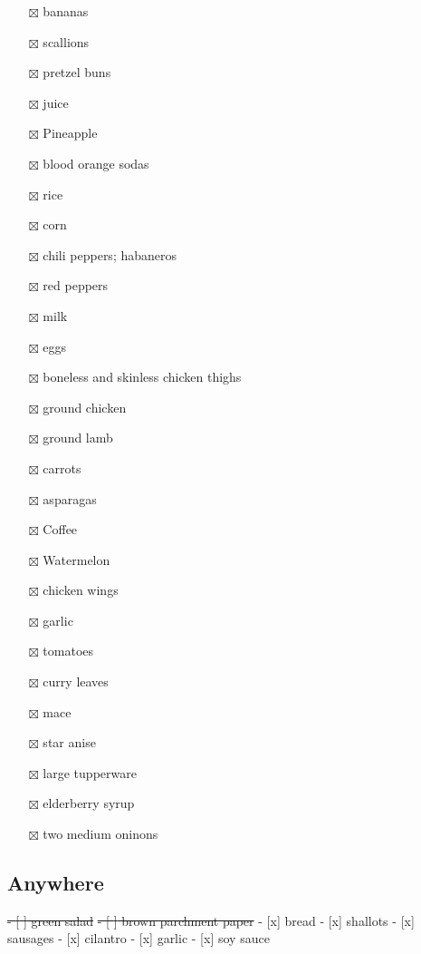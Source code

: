\documentclass[
]{article}
\providecommand{\tightlist}{%
  \setlength{\itemsep}{0pt}\setlength{\parskip}{0pt}}
\begin{document}
\begin{itemize}
\tightlist
\item[$\boxtimes$]
  bananas
\item[$\boxtimes$]
  scallions
\item[$\boxtimes$]
  pretzel buns
\item[$\boxtimes$]
  juice
\item[$\boxtimes$]
  Pineapple
\item[$\boxtimes$]
  blood orange sodas
\item[$\boxtimes$]
  rice
\item[$\boxtimes$]
  corn
\item[$\boxtimes$]
  chili peppers; habaneros
\item[$\boxtimes$]
  red peppers
\item[$\boxtimes$]
  milk
\item[$\boxtimes$]
  eggs
\item[$\boxtimes$]
  boneless and skinless chicken thighs
\item[$\boxtimes$]
  ground chicken
\item[$\boxtimes$]
  ground lamb
\item[$\boxtimes$]
  carrots
\item[$\boxtimes$]
  asparagas
\item[$\boxtimes$]
  Coffee
\item[$\boxtimes$]
  Watermelon
\item[$\boxtimes$]
  chicken wings
\item[$\boxtimes$]
  garlic
\item[$\boxtimes$]
  tomatoes
\item[$\boxtimes$]
  curry leaves
\item[$\boxtimes$]
  mace
\item[$\boxtimes$]
  star anise
\item[$\boxtimes$]
  large tupperware
\item[$\boxtimes$]
  elderberry syrup
\item[$\boxtimes$]
  two medium oninons
\end{itemize}

\hypertarget{anywhere}{%
\subsection{Anywhere}\label{anywhere}}

\sout{- {[} {]} green salad}
\sout{- {[} {]} brown parchment paper}
- {[}x{]} bread
- {[}x{]} shallots
- {[}x{]} sausages
- {[}x{]} cilantro
- {[}x{]} garlic
- {[}x{]} soy sauce
\end{document}
